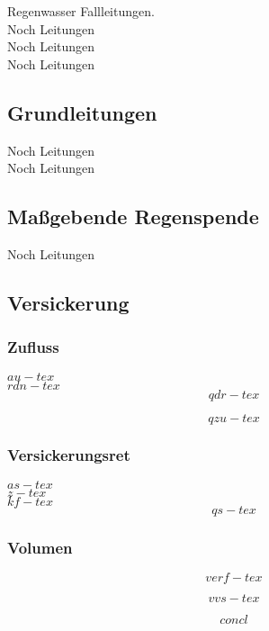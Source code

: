 \documentclass[12pt]{report}
\begin{document}
Regenwasser Fallleitungen.\\
Noch Leitungen\\
Noch Leitungen\\
Noch Leitungen\\

\subsection{Grundleitungen}

Noch Leitungen\\
Noch Leitungen\\

\subsection{Maßgebende Regenspende}

Noch Leitungen\\

\subsection{Versickerung}

\subsubsection{Zufluss}

$au-tex$ \\
$rdn-tex$ \\

\begin{equation}
        qdr-tex
\end{equation}

\begin{equation}
        qzu-tex
\end{equation}

\subsubsection{Versickerungsret}

$as-tex$ \\
$z-tex$ \\
$kf-tex$ \\

\begin{equation}
        qs-tex
\end{equation}

\subsubsection{Volumen}

\begin{equation}
        verf-tex
\end{equation}

\begin{equation}
        vvs-tex
\end{equation}

\begin{equation}
        concl
\end{equation}
\end{document}
